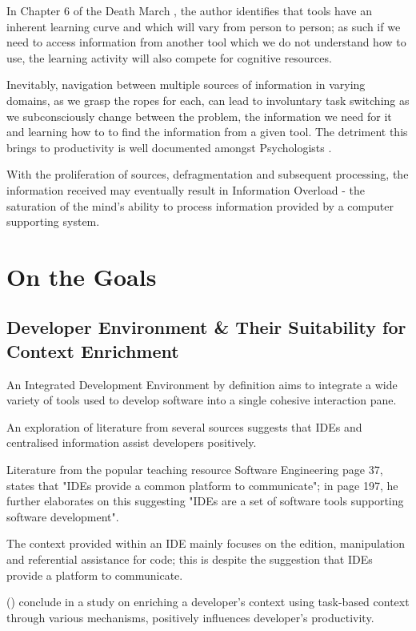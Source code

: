 In Chapter 6 of the Death March \parencite{yourdon2003death}, the author identifies that tools have an inherent learning curve and which will vary from person to person; as such if we need to access information from another tool which we do not understand how to use, the learning activity will also compete for cognitive resources.

Inevitably, navigation between multiple sources of information in varying domains, as we grasp the ropes for each, can lead to involuntary task switching as we subconsciously change between the problem, the information we need for it and learning how to to find the information from a given tool. The detriment this brings to productivity is well documented amongst Psychologists \parencite{apaMultitasking}.

With the proliferation of sources, defragmentation and subsequent processing, the information received may eventually result in Information Overload - the saturation of the mind's ability to process information provided by a computer supporting system.

\section{On the Goals}

\subsection{Developer Environment \& Their Suitability for Context Enrichment}

An Integrated Development Environment by definition aims to integrate a wide variety of tools used to develop software into a single cohesive interaction pane. 

An exploration of literature from several sources suggests that IDEs and centralised information assist developers positively. 

Literature from the popular teaching resource Software Engineering \parencite{Sommerville:2010:SE:1841764} page 37, states that "IDEs provide a common platform to communicate"; in page 197, he further elaborates on this suggesting "IDEs are a set of software tools supporting software development".

The context provided within an IDE mainly focuses on the edition, manipulation and referential assistance for code; this is despite the suggestion that IDEs provide a platform to communicate.

\citeauthor{kersten2006using} () conclude in a study on enriching a developer's context using task-based context through various mechanisms, positively influences developer's productivity.

